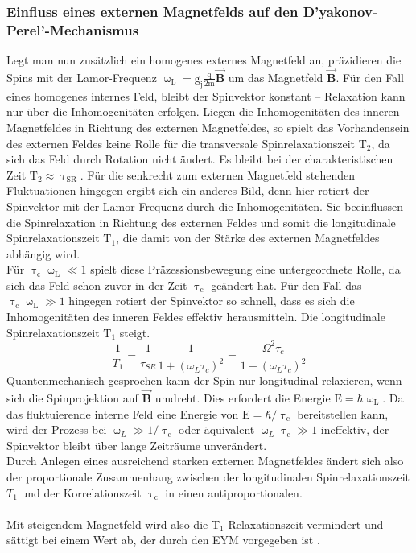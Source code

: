 \subsubsection{Einfluss eines externen Magnetfelds auf den D'yakonov-Perel'-Mechanismus}
Legt man nun zusätzlich ein homogenes externes Magnetfeld an, präzidieren die Spins  mit der Lamor-Frequenz $\upomega_\text{L}=\text{g}_\text{j}\frac{\text{q}}{\text{2m}}\vec{\textbf{B}}$ um das Magnetfeld $\vec{\textbf{B}}$. Für den Fall eines homogenes internes Feld, bleibt der Spinvektor konstant – Relaxation kann nur über die Inhomogenitäten erfolgen. Liegen die Inhomogenitäten des inneren Magnetfeldes in Richtung des externen Magnetfeldes, so spielt das Vorhandensein des externen Feldes keine Rolle für die transversale Spinrelaxationszeit $\text{T}_\text{2}$, da sich das Feld durch Rotation nicht ändert. Es bleibt bei der charakteristischen Zeit $\text{T}_\text{2} \approx \uptau_\text{SR}$. 
Für die senkrecht zum externen Magnetfeld stehenden Fluktuationen hingegen ergibt sich ein anderes Bild, denn hier rotiert der Spinvektor mit der Lamor-Frequenz durch die Inhomogenitäten. Sie beeinflussen die Spinrelaxation in Richtung des externen Feldes und somit die longitudinale Spinrelaxationszeit $\text{T}_\text{1}$, die damit von der Stärke des externen Magnetfeldes abhängig wird.\\
Für $\uptau_\text{c}\upomega_\text{L} \ll \text{1}$ spielt diese Präzessionsbewegung eine untergeordnete Rolle, da sich das Feld schon zuvor in der Zeit $\uptau_\text{c}$ geändert hat. Für den Fall das $\uptau_\text{c} \upomega_\text{L} \gg \text{1}$ hingegen rotiert der Spinvektor so schnell, dass es sich die Inhomogenitäten des inneren Feldes effektiv herausmitteln. Die longitudinale Spinrelaxationszeit $\text{T}_\text{1}$ steigt.
\begin{equation}
\frac{1}{T_1}=\frac{1}{\tau_{SR}}\frac{1}{1+(\omega_L \tau_{c})^2}=\frac{\Omega^2 \tau_c}{1+(\omega_L \tau_{c})^2}
\end{equation}
Quantenmechanisch gesprochen kann der Spin nur longitudinal relaxieren, wenn sich die Spinprojektion auf $\vec{\textbf{B}}$  umdreht. Dies erfordert die Energie $\text{E}=\hbar\upomega_\text{L}$. Da das fluktuierende interne Feld eine Energie von $\text{E}=\hbar/\uptau_\text{c}$ bereitstellen kann, wird der Prozess bei $\upomega_{L}\gg\text{1}/\uptau_\text{c}$ oder äquivalent $\upomega_{L}\uptau_\text{c}\gg\text{1}$ ineffektiv, der Spinvektor bleibt über lange Zeiträume unverändert.\\
Durch Anlegen eines ausreichend starken externen Magnetfeldes ändert sich also der proportionale Zusammenhang zwischen der longitudinalen Spinrelaxationszeit $T_\text{1}$ und der Korrelationszeit $\uptau_\text{c}$ in einen antiproportionalen. \cite{Dyakonov.2008}\\
\\
Mit steigendem Magnetfeld wird also die T$_\text{1}$ Relaxationszeit vermindert und sättigt bei einem Wert ab, der durch den EYM vorgegeben ist \cite{Bronold.2002}.
